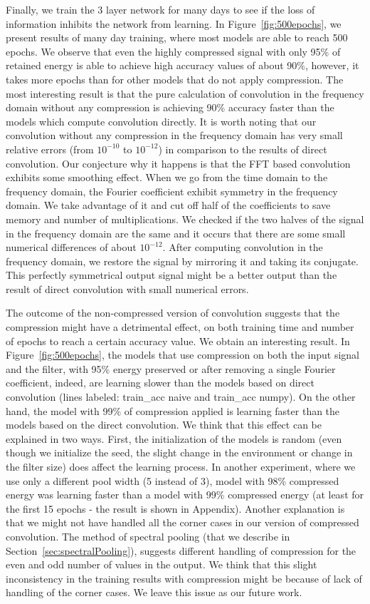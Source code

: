 Finally, we train the 3 layer network for many days to see if the loss of information inhibits the network from learning. In Figure~\ref{fig:500epochs}, we present results of many day training, where most models are able to reach 500 epochs. We observe that even the highly compressed signal with only 95\% of retained energy is able to achieve high accuracy values of about 90\%, however, it takes more epochs than for other models that do not apply compression. The most interesting result is that the pure calculation of convolution in the frequency domain without any compression is achieving 90\% accuracy faster than the models which compute convolution directly. It is worth noting that our convolution without any compression in the frequency domain has very small relative errors (from $10^{-10}$ to $10^{-12}$) in comparison to the results of direct convolution. Our conjecture why it happens is that the FFT based convolution exhibits some smoothing effect. When we go from the time domain to the frequency domain, the Fourier coefficient exhibit symmetry in the frequency domain. We take advantage of it and cut off half of the coefficients to save memory and number of multiplications. We checked if the two halves of the signal in the frequency domain are the same and it occurs that there are some small numerical differences of about $10^{-12}$. After computing convolution in the frequency domain, we restore the signal by mirroring it and taking its conjugate. This perfectly symmetrical output signal might be a better output than the result of direct convolution with small numerical errors.

The outcome of the non-compressed version of convolution suggests that the compression might have a detrimental effect, on both training time and number of epochs to reach a certain accuracy value. We obtain an interesting result. In Figure~\ref{fig:500epochs}, the models that use compression on both the input signal and the filter, with 95\% energy preserved or after removing a single Fourier coefficient, indeed, are learning slower than the models based on direct convolution (lines labeled: train\_acc naive and train\_acc numpy). On the other hand, the model with 99\% of compression applied is learning faster than the models based on the direct convolution. We think that this effect can be explained in two ways. First, the initialization of the models is random (even though we initialize the seed, the slight change in the environment or change in the filter size) does affect the learning process. In another experiment, where we use only a different pool width (5 instead of 3), model with 98\% compressed energy was learning faster than a model with 99\% compressed energy (at least for the first 15 epochs - the result is shown in Appendix). Another explanation is that we might not have handled all the corner cases in our version of compressed convolution. The method of spectral pooling (that we describe in Section~\ref{sec:spectralPooling}), suggests different handling of compression for the even and odd number of values in the output. We think that this slight inconsistency in the training results with compression might be because of lack of handling of the corner cases. We leave this issue as our future work.


